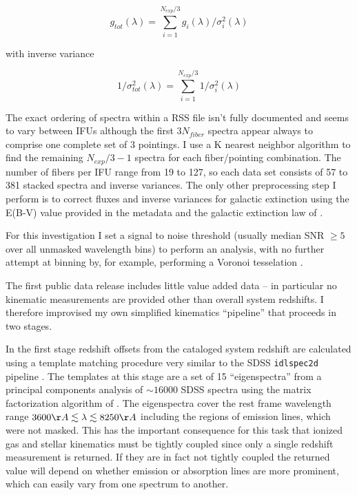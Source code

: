 \documentclass[modern]{aastex62}
\begin{document}
\begin{equation}
g_{tot}(\lambda) = \sum_{i=1}^{N_{exp}/3} g_i(\lambda)/\sigma_i^2(\lambda)
\end{equation}

with inverse variance

\begin{equation}
1/\sigma_{tot}^2(\lambda) = \sum_{i=1}^{N_{exp}/3} 1/\sigma_i^2(\lambda)
\end{equation}


The exact ordering of spectra within a RSS file isn't fully documented and seems to vary between IFUs although the first $3N_{fiber}$ spectra appear always to comprise one complete set of 3 pointings. I use a K nearest neighbor algorithm to find the remaining $N_{exp}/3 - 1$ spectra for each fiber/pointing combination. The number of fibers per IFU range from 19 to 127, so each data set consists of 57 to 381 stacked spectra and inverse variances. The only other preprocessing step I perform is to correct fluxes and inverse variances for galactic extinction using the E(B-V) value provided in the metadata and the galactic extinction law of \citet{1999PASP..111...63F}.

For this investigation I set a signal to noise threshold (usually median SNR $\ge 5$ over all unmasked wavelength bins) to perform an analysis, with no further attempt at binning by, for example, performing a Voronoi tesselation \citep{2003MNRAS.342..345C}.

The first public data release includes little value added data -- in particular no kinematic measurements are provided other than overall system redshifts. I therefore improvised my own simplified kinematics ``pipeline'' that proceeds in two stages.

In the first stage redshift offsets from the cataloged system redshift are calculated using a template matching procedure very similar to the SDSS \texttt{idlspec2d} pipeline \citep{2011ApJS..193...29A, 2012AJ....144..144B}. The templates at this stage are a set of 15 ``eigenspectra'' from a principal components analysis of $\sim 16000$ SDSS spectra using the matrix factorization algorithm of \citet{2012ApJ...753..122T}. The eigenspectra cover the rest frame wavelength range $3600 \AA \lesssim \lambda \lesssim 8250 \AA$ including the regions of emission lines, which were not masked. This has the important consequence for this task that ionized gas and stellar kinematics must be tightly coupled since only a single redshift measurement is returned. If they are in fact not tightly coupled the returned value will depend on whether emission or absorption lines are more prominent, which can easily vary from one spectrum to another. 
\end{document}

